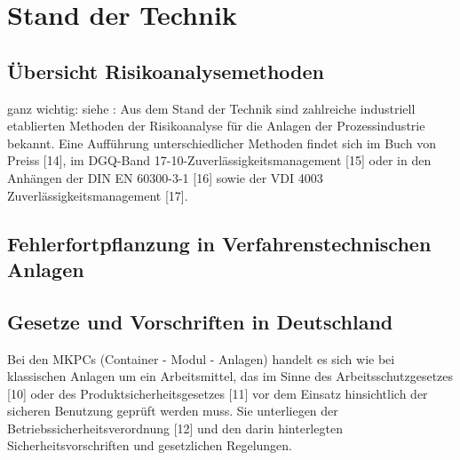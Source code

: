 \chapter{Stand der Technik}
\section{\"Ubersicht Risikoanalysemethoden}
ganz wichtig: siehe \cite[S. 4]{Fleischer_2015}: Aus dem Stand der Technik sind zahlreiche industriell etablierten Methoden der Risikoanalyse f\"ur die Anlagen der
Prozessindustrie bekannt. Eine Auff\"uhrung unterschiedlicher Methoden findet sich im Buch von Preiss [14], im DGQ-Band 17-10-Zuverl\"assigkeitsmanagement [15] oder
in den Anh\"angen der DIN EN 60300-3-1 [16] sowie der
VDI 4003 Zuverl\"assigkeitsmanagement [17].
\section{Fehlerfortpflanzung in Verfahrenstechnischen Anlagen}
\section{Gesetze und Vorschriften in Deutschland}
Bei den MKPCs (Container - Modul - Anlagen) handelt es sich wie
bei klassischen Anlagen um ein
Arbeitsmittel, das im Sinne des
Arbeitsschutzgesetzes [10] oder des
Produktsicherheitsgesetzes [11] vor
dem Einsatz hinsichtlich der sicheren
Benutzung gepr\"uft werden muss. Sie
unterliegen der Betriebssicherheitsverordnung [12] und den darin hinterlegten Sicherheitsvorschriften und
gesetzlichen Regelungen.
